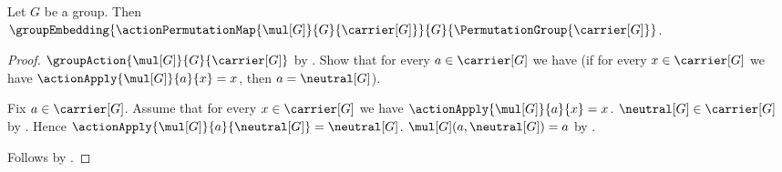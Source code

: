 \begin{theorem}\label{cayley_theorem}
    Let $G$ be a group.
    Then
        $\groupEmbedding
            {\actionPermutationMap{\mul[G]}{G}{\carrier[G]}}
            {G}{\PermutationGroup{\carrier[G]}}$.
\end{theorem}
\begin{proof}
    $\groupAction{\mul[G]}{G}{\carrier[G]}$ by
        .
    Show that for every $a\in\carrier[G]$ we have
        (if for every $x\in\carrier[G]$ we have
            $\actionApply{\mul[G]}{a}{x}=x$, then
            $a=\neutral[G]$).
    \begin{subproof}
        Fix $a\in\carrier[G]$.
        Assume that for every $x\in\carrier[G]$ we have
            $\actionApply{\mul[G]}{a}{x}=x$.
        $\neutral[G]\in\carrier[G]$ by
            .
        Hence
            $\actionApply{\mul[G]}{a}{\neutral[G]}=\neutral[G]$.
        $\mul[G](a,\neutral[G])=a$ by
            .
    \end{subproof}
    Follows by .
\end{proof}
